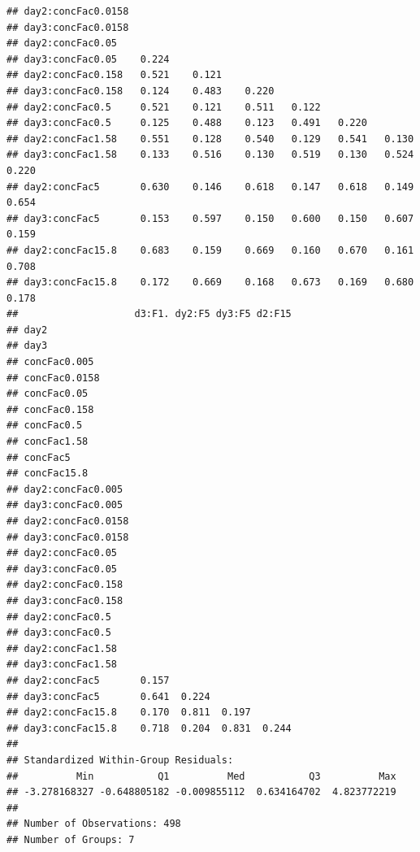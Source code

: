 \documentclass[
]{article}
\begin{document}
\begin{verbatim}
## day2:concFac0.0158                                                         
## day3:concFac0.0158                                                         
## day2:concFac0.05                                                           
## day3:concFac0.05    0.224                                                  
## day2:concFac0.158   0.521    0.121                                         
## day3:concFac0.158   0.124    0.483    0.220                                
## day2:concFac0.5     0.521    0.121    0.511   0.122                        
## day3:concFac0.5     0.125    0.488    0.123   0.491   0.220                
## day2:concFac1.58    0.551    0.128    0.540   0.129   0.541   0.130        
## day3:concFac1.58    0.133    0.516    0.130   0.519   0.130   0.524   0.220
## day2:concFac5       0.630    0.146    0.618   0.147   0.618   0.149   0.654
## day3:concFac5       0.153    0.597    0.150   0.600   0.150   0.607   0.159
## day2:concFac15.8    0.683    0.159    0.669   0.160   0.670   0.161   0.708
## day3:concFac15.8    0.172    0.669    0.168   0.673   0.169   0.680   0.178
##                    d3:F1. dy2:F5 dy3:F5 d2:F15
## day2                                          
## day3                                          
## concFac0.005                                  
## concFac0.0158                                 
## concFac0.05                                   
## concFac0.158                                  
## concFac0.5                                    
## concFac1.58                                   
## concFac5                                      
## concFac15.8                                   
## day2:concFac0.005                             
## day3:concFac0.005                             
## day2:concFac0.0158                            
## day3:concFac0.0158                            
## day2:concFac0.05                              
## day3:concFac0.05                              
## day2:concFac0.158                             
## day3:concFac0.158                             
## day2:concFac0.5                               
## day3:concFac0.5                               
## day2:concFac1.58                              
## day3:concFac1.58                              
## day2:concFac5       0.157                     
## day3:concFac5       0.641  0.224              
## day2:concFac15.8    0.170  0.811  0.197       
## day3:concFac15.8    0.718  0.204  0.831  0.244
## 
## Standardized Within-Group Residuals:
##          Min           Q1          Med           Q3          Max 
## -3.278168327 -0.648805182 -0.009855112  0.634164702  4.823772219 
## 
## Number of Observations: 498
## Number of Groups: 7
\end{verbatim}
\end{document}

